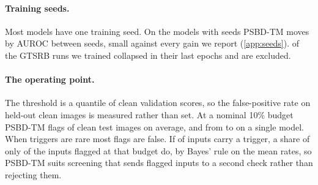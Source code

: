 \paragraph{Training seeds.}
Most models have one training seed. On the \SeedCells{} models with \SeedsPerCell{} seeds PSBD-TM moves by \SeedSdRecommended{} AUROC between seeds, small against every gain we report (\cref{app:seeds}). \GtsrbDivergedRuns{} of the \GtsrbRunsScored{} GTSRB runs we trained collapsed in their last epochs and are excluded.

\paragraph{The operating point.}
The threshold is a quantile of clean validation scores, so the false-positive rate on held-out clean images is measured rather than set. At a nominal 10\% budget PSBD-TM flags \RealizedFprOneZero{} of clean test images on average, and from \RealizedFprOneZeroMin{} to \RealizedFprOneZeroMax{} on a single model. When triggers are rare most flags are false. If \DeploymentPrevalence{} of inputs carry a trigger, a share of only \PrecisionOneZero{} of the inputs flagged at that budget do, by Bayes' rule on the mean rates, so PSBD-TM suits screening that sends flagged inputs to a second check rather than rejecting them.
